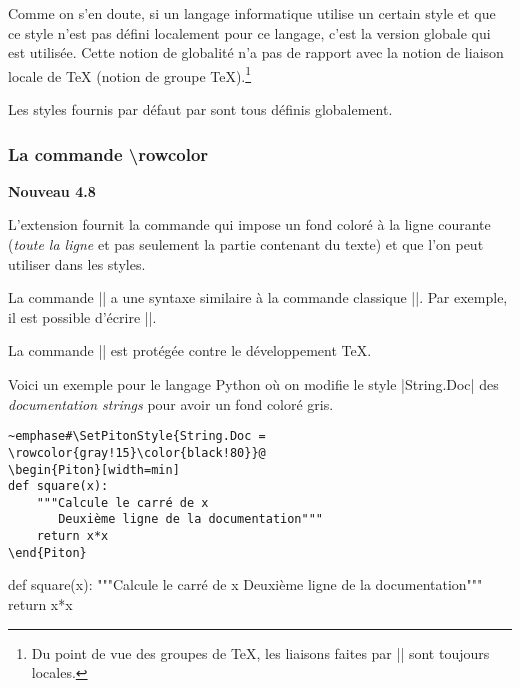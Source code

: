 \documentclass[dvipsnames,svgnames]{article}
\begin{document}
\medskip
Comme on s'en doute, si un langage informatique utilise un certain style et que ce style
n'est pas défini localement pour ce langage, c'est la version globale qui est utilisée.
Cette notion de globalité n'a pas de rapport avec la notion de liaison locale de TeX
(notion de groupe TeX).\footnote{Du point de vue des groupes de TeX, les liaisons faites
  par |\SetPitonStyle| sont toujours locales.}

\medskip
Les styles fournis par défaut par  sont tous définis globalement.


\bigskip
\subsubsection{La commande \textbackslash rowcolor}

\label{rowcolor}

\colorbox{yellow!50}{\textbf{Nouveau 4.8}}

\nobreak
\medskip
L'extension  fournit la commande  qui impose un
fond coloré à la ligne courante (\emph{toute la ligne} et pas seulement la partie
contenant du texte) et que l'on peut utiliser dans les styles.

\smallskip
La commande |\rowcolor| a une syntaxe similaire à la commande classique |\color|. Par
exemple, il est possible d'écrire ||.

\smallskip
La commande |\rowcolor| est protégée contre le développement TeX.

\smallskip
Voici un exemple pour le langage Python où on modifie le style |String.Doc|
des \emph{documentation strings} pour avoir un fond coloré gris.


\begin{Verbatim}
~emphase#\SetPitonStyle{String.Doc = \rowcolor{gray!15}\color{black!80}}@
\begin{Piton}[width=min]
def square(x):
    """Calcule le carré de x
       Deuxième ligne de la documentation"""
    return x*x
\end{Piton}
\end{Verbatim}


\bigskip
\begingroup
{}
\begin{Piton}[width=min]
def square(x):
    """Calcule le carré de x
       Deuxième ligne de la documentation"""
    return x*x
\end{Piton}
\endgroup
\end{document}
